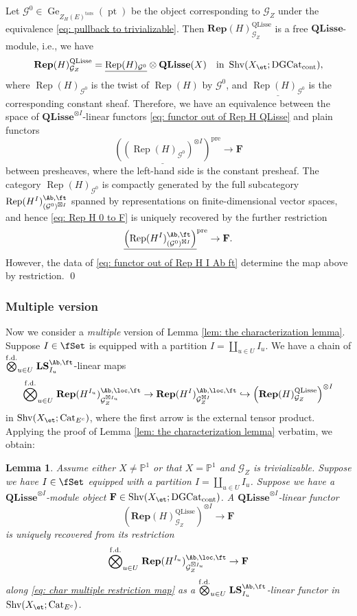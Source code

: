 \documentclass[10pt]{amsart}
\newcommand{\sssec}{\subsubsection}
\newtheorem{lemma}[subsubsection]{Lemma}
\theoremstyle{remark}
\newcommand{\te}{\text}
\newcommand{\ul}{\underline}
\newcommand{\pjl}{\mathbb{P}^1}
\newcommand{\on}{\operatorname}
\newcommand{\cG}{\mathcal{G}}
\newcommand{\Cat}{\on{Cat}}
\newcommand{\CatEc}{\Cat_{E^c}}
\newcommand{\DGcat}{\on{DGCat}_{\on{cont}}}
\newcommand{\Rep}{\on{Rep}}
\newcommand{\Shv}{\on{Shv}}
\newcommand{\QLisse}{\on{QLisse}}
\newcommand{\pt}{\on{pt}}
\newcommand{\Ectensbig}{\stackrel{\on{f.d.}}{\bigotimes}}
\begin{document}
Let $\cG^0\in \on{Ge}_{Z_H(E)^{\on{tors}}}(\pt)$ be the object corresponding to $\cG_Z$ under the equivalence \eqref{eq: pullback to trivializable}. Then $\mathbf{Rep}(H)^{\QLisse}_{\cG_Z}$ is a free $\mathbf{QLisse}$-module, i.e., we have
\[\mathbf{Rep}(H)^{\QLisse}_{\cG_Z}= \ul{\Rep(H)_{\cG^0}}\otimes \mathbf{QLisse}(X)\quad \te{in }\Shv(X_{\et};\DGcat),\]
where $\Rep(H)_{\cG^0}$ is the twist of $\Rep(H)$ by $\cG^0$, and $\ul{\Rep(H)_{\cG^0}}$ is the corresponding constant sheaf. Therefore, we have an equivalence between the space of $\mathbf{QLisse}^{\otimes I}$-linear functors \eqref{eq: functor out of Rep H QLisse} and plain functors
\begin{equation}\label{eq: Rep H 0 to F}
    \ul{\left(\left(\Rep(H)_{\cG^0}\right)^{\otimes I}\right)}^{\on{pre}}\rightarrow \mathbf{F}
\end{equation}
between presheaves, where the left-hand side is the constant presheaf. The category $\Rep(H)_{\cG^0}$ is compactly generated by the full subcategory $\Rep(H^I)^{\Ab,\ft}_{(\cG^0)^{\boxtimes I}}$ spanned by representations on finite-dimensional vector spaces, and hence \eqref{eq: Rep H 0 to F} is uniquely recovered by the further restriction
\begin{equation*}
\ul{\left(\Rep(H^I)^{\Ab,\ft}_{(\cG^0)^{\boxtimes I}}\right)}^{\on{pre}}\rightarrow \mathbf{F}.
\end{equation*}
However, the data of \eqref{eq: functor out of Rep H I Ab ft} determine the map above by restriction.  \qed


    \sssec{Multiple version}
    Now we consider a \emph{multiple} version of Lemma \ref{lem: the characterization lemma}. Suppose $I\in\fSet$ is equipped with a partition $I=\coprod_{u\in U}I_u$. We have a chain of $\Ectensbig_{u\in U}\mathbf{LS}^{\Ab,\ft}_{I_u}$-linear maps
\begin{equation}\label{eq: char multiple restriction map}
   \Ectensbig_{u\in U}\mathbf{Rep}(H^{I_u})^{\Ab,\loc,\ft}_{\cG^{\boxtimes I_u}_Z}\rightarrow \mathbf{Rep}(H^{I})^{\Ab,\loc,\ft}_{\cG^{\boxtimes I}_Z} \hookrightarrow \left(\mathbf{Rep}(H)^{\QLisse}_{\cG_Z}\right)^{\otimes I}  
\end{equation}
in $\Shv(X_{\et};\CatEc)$, where the first arrow is the external tensor product. Applying the proof of Lemma \ref{lem: the characterization lemma} verbatim, we obtain:

    \begin{lemma}\label{lem: the characterization lemma multiple}
    Assume either $X\ne \pjl$ or that $X=\pjl$ and $\cG_Z$ is trivializable.
        Suppose we have $I\in\fSet$ equipped with a partition $I=\coprod_{u\in U} I_u$.
        Suppose we have a $\mathbf{QLisse}^{\otimes I}$-module object $\mathbf{F}\in \Shv(X_{\et};\DGcat)$. A $\mathbf{QLisse}^{\otimes I}$-linear functor
        \[\left(\mathbf{Rep}(H)^{\QLisse}_{\cG_Z}\right)^{\otimes I}\rightarrow \mathbf{F}\]
        is uniquely recovered from its restriction 
        \[\Ectensbig_{u\in U}\mathbf{Rep}(H^{I_u})^{\Ab,\loc,\ft}_{\cG^{\boxtimes I_u}_Z}\rightarrow \mathbf{F}\]
        along \eqref{eq: char multiple restriction map} as a $\Ectensbig_{u\in U}\mathbf{LS}^{\Ab,\ft}_{I_u}$-linear functor in $\Shv(X_{\et}; \CatEc)$. 
    \end{lemma}
\end{document}
